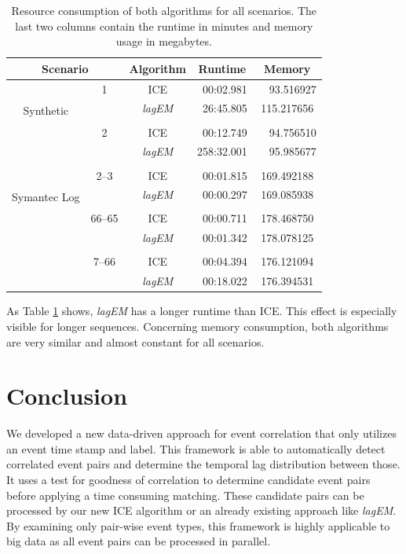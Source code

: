 \documentclass[conference]{IEEEtran}
\theoremstyle{examplestyle}
\begin{document}
\begin{table}[!tb]
	\centering
	\caption{Resource consumption of both algorithms for all scenarios. The last two columns contain the runtime in minutes and memory usage in megabytes.}
	\label{tbl:resources}
	\begin{tabular}{c c c c c}
		\multicolumn{2}{c}{\textbf{Scenario}} & \textbf{Algorithm} & \textbf{Runtime} & \textbf{Memory} \\
		\hline
		\multirow{4}{2mm}{\begin{sideways} Synthetic \hspace{1mm} \end{sideways}}
		&	1	& \ac{ICE}				&	~00:02.981	&	~~93.516927	\\
		& 		& \textit{lagEM}		&	~26:45.805	&	115.217656	\\
		\\[-1ex]
		&	2	& \ac{ICE}				&	~00:12.749	&	~~94.756510	\\
		&		& \textit{lagEM}		&	258:32.001	&	~~95.985677	\\
		\hline
		\\[-1ex]
		\multirow{4}{2mm}{\begin{sideways} Symantec Log \hspace{2mm} \end{sideways}}
		&  2--3 & \ac{ICE}				&	~00:01.815	&	169.492188 \\
		&		& \textit{lagEM}		&	~00:00.297	&	169.085938 \\[-1ex]
		\\
		& 66--65 & \ac{ICE}			&	~00:00.711	&	178.468750 \\
		&		& \textit{lagEM}		&	~00:01.342	&	178.078125 \\[-1ex]
		\\
		& 7--66 & \ac{ICE}			&	~00:04.394	&	176.121094 \\
		&		& \textit{lagEM}		&	~00:18.022	&	176.394531
	\end{tabular}

\end{table}



As Table \ref{tbl:resources} shows, \textit{lagEM} has a longer runtime than \ac{ICE}. This effect is especially visible for longer sequences. Concerning memory consumption, both algorithms are very similar and almost constant for all scenarios.



\section{Conclusion} \label{sec:conc}
We developed a new data-driven approach for event correlation that only utilizes an event time stamp and label. This framework is able to automatically detect correlated event pairs and determine the temporal lag distribution between those. It uses a test for goodness of correlation to determine candidate event pairs before applying a time consuming matching. These candidate pairs can be processed by our new \ac{ICE} algorithm or an already existing approach like \textit{lagEM}. By examining only pair-wise event types, this framework is highly applicable to big data as all event pairs can be processed in parallel.
\end{document}
